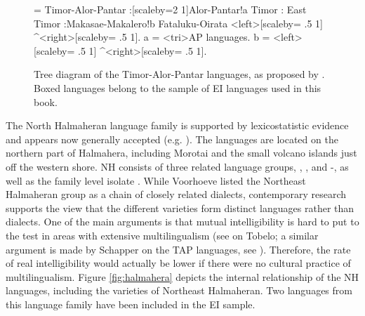 \begin{figure}

\begin{footnotesize}
\jtree[xunit=5em,yunit=2em]
\! = {Timor-Alor-Pantar}
:[scaleby=2 1]{Alor-Pantar}!a {Timor}
:{} {East Timor}
:{Makasae-Makalero}!b {Fataluku-Oirata}
<left>[scaleby= .5 1]{} ^<right>[scaleby= .5 1]{}.
\!a = <tri>{AP languages}{}.
\!b = <left>[scaleby= .5 1]{} ^<right>[scaleby= .5 1]{}.
\endjtree
\end{footnotesize}

\caption[The Timor-Alor-Pantar languages]{Tree diagram of the Timor-Alor-Pantar languages, as proposed by \citealt{schapper2014intro}. Boxed languages belong to the sample of EI languages used in this book.}\label{fig:timor-alor-pantar}
\end{figure}

The North Halmaheran language family is supported by lexicostatistic evidence and appears now generally accepted (e.g. \citealt{Voorhoeve1994, reesink2005west}). The languages are located on the northern part of Halmahera, including Morotai and the small volcano islands just off the western shore. NH consists of three related language groups, , , and -, as well as the family level isolate  \citep{Voorhoeve1994}. While Voorhoeve listed the Northeast Halmaheran group as a chain of closely related dialects, contemporary research supports the view that the different varieties  form distinct languages rather than dialects. One of the main arguments is that mutual intelligibility is hard to put to the test in areas with extensive multilingualism (see \citealt{holton2003tobelo} on Tobelo; a similar argument is made by Schapper on the TAP languages, see \citealt[3]{schapper2014intro}). Therefore, the rate of real intelligibility would actually be lower if there were no cultural practice of multilingualism. Figure \ref{fig:halmahera} depicts the internal relationship of the NH languages, including the varieties of Northeast Halmaheran. Two languages from this language family have been included in the EI sample.

